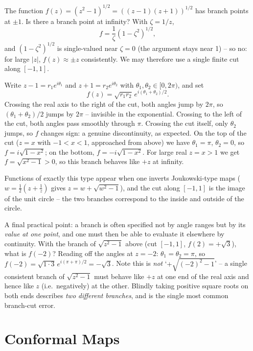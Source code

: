 \documentclass[a4paper]{scrartcl}
\begin{document}
\begin{example}
	The function $f(z) = (z^2 - 1)^{1/2} = ((z-1)(z+1))^{1/2}$ has branch points at $\pm 1$. Is there a branch point at infinity? With $\zeta = 1/z$,
	$$
	f = \frac{1}{\zeta}(1 - \zeta^2)^{1/2},
	$$
	and $(1 - \zeta^2)^{1/2}$ is single-valued near $\zeta = 0$ (the argument stays near 1) -- so no: for large $|z|$, $f(z) \approx \pm z$ consistently. We may therefore use a single finite cut along $[-1, 1]$.

	Write $z - 1 = r_1 e^{i\theta_1}$ and $z + 1 = r_2 e^{i\theta_2}$ with $\theta_1, \theta_2 \in [0, 2\pi)$, and set
	$$
	f(z) = \sqrt{r_1 r_2} \, e^{i(\theta_1 + \theta_2)/2}.
	$$
	Crossing the real axis to the right of the cut, both angles jump by $2\pi$, so $(\theta_1 + \theta_2)/2$ jumps by $2\pi$ -- invisible in the exponential. Crossing to the left of the cut, both angles pass smoothly through $\pi$. Crossing the cut itself, only $\theta_2$ jumps, so $f$ changes sign: a genuine discontinuity, as expected. On the top of the cut ($z = x$ with $-1 < x < 1$, approached from above) we have $\theta_1 = \pi$, $\theta_2 = 0$, so $f = i\sqrt{1 - x^2}$; on the bottom, $f = -i\sqrt{1 - x^2}$. For large real $z = x > 1$ we get $f = \sqrt{x^2 - 1} > 0$, so this branch behaves like $+z$ at infinity.

	Functions of exactly this type appear when one inverts Joukowski-type maps ($w = \frac 12 (z + \frac 1z)$ gives $z = w + \sqrt{w^2 - 1}$), and the cut along $[-1, 1]$ is the image of the unit circle -- the two branches correspond to the inside and outside of the circle.
\end{example}

A final practical point: a branch is often specified not by angle ranges but by its \emph{value at one point}, and one must then be able to evaluate it elsewhere by continuity. With the branch of $\sqrt{z^2 - 1}$ above (cut $[-1,1]$, $f(2) = +\sqrt 3$), what is $f(-2)$? Reading off the angles at $z = -2$: $\theta_1 = \theta_2 = \pi$, so $f(-2) = \sqrt{1 \cdot 3}\, e^{i(\pi + \pi)/2} = -\sqrt 3$. Note this is \emph{not} `$+\sqrt{(-2)^2 - 1}$' -- a single consistent branch of $\sqrt{z^2 - 1}$ must behave like $+z$ at one end of the real axis and hence like $z$ (i.e.\ negatively) at the other. Blindly taking positive square roots on both ends describes \emph{two different branches}, and is the single most common branch-cut error.

\section{Conformal Maps}
\end{document}
